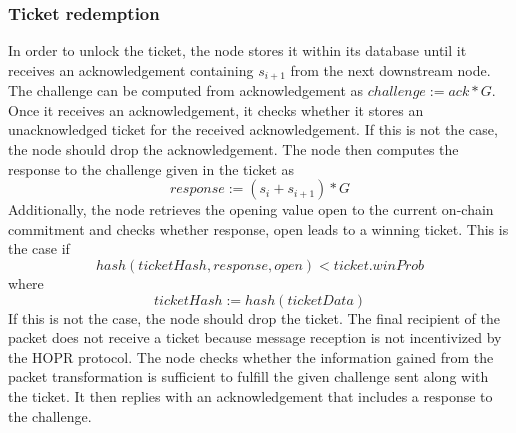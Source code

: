 \subsubsection{Ticket redemption}
In order to unlock the ticket, the node stores it within its database until it receives an acknowledgement containing $s_{i+1}$ from the next downstream node. 
The challenge can be computed from acknowledgement as $challenge:=ack*G$.
\newline Once it receives an acknowledgement, it checks whether it stores an unacknowledged ticket for the received acknowledgement. 
If this is not the case, the node should drop the acknowledgement.  
\newline The node then computes the response to the challenge given in the ticket as $$response:=(s_i+s_{i+1})*G$$
Additionally, the node retrieves the opening value open to the current on-chain commitment and checks whether response, open leads to a winning ticket. 
This is the case if $$hash( ticketHash, response, open ) <ticket.winProb$$ where $$ticketHash:=hash( ticketData )$$
If this is not the case, the node should drop the ticket. 
The final recipient of the packet does not receive a ticket because message reception is not incentivized by the HOPR protocol.
\newline The node checks whether the information gained from the packet transformation is sufficient to fulfill the given challenge sent along with the ticket. It then replies with an acknowledgement that includes a response to the challenge.








